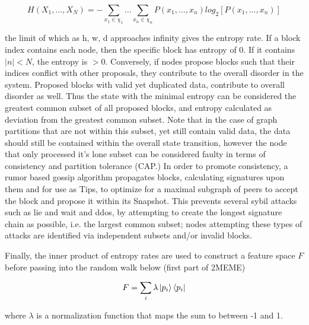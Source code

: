 \documentclass{article}
\begin{document}
\begin{equation}
H(X_1, \dots, X_N) = -\sum_{x_1 \in \chi_1} \dots \sum_{x_n \in \chi_n} P(x_1,  \dots, x_n) log_2 [P(x_1, \dots, x_n)]
\end{equation}
	
	the limit of which as h, w, d approaches infinity gives the entropy rate.
If a block index contains each node, then the specific block has entropy of 0. If it contains $|n| < N$, the entropy is $> 0$. Conversely, if nodes propose blocks such that their indices conflict with other proposals, they contribute to the overall disorder in the system. Proposed blocks with valid yet duplicated data, contribute to overall disorder as well. Thus the state with the minimal entropy can be considered the greatest common subset of all proposed blocks, and entropy calculated as deviation from the greatest common subset. Note that in the case of graph partitions that are not within this subset, yet still contain valid data, the data should still be contained within the overall state transition, however the node that only processed it’s lone subset can be considered faulty in terms of consistency and partition tolerance (CAP.) In order to promote consistency, a rumor based gossip algorithm propagates blocks, calculating signatures upon them and for use as Tips, to optimize for a maximal subgraph of peers to accept the block and propose it within its Snapshot. This prevents several sybil attacks such as lie and wait and ddos, by attempting to create the longest signature chain as possible, i.e. the largest common subset; nodes attempting these types of attacks are identified via independent subsets and/or invalid blocks.

Finally, the inner product of entropy rates are used to construct a feature space $F$ before passing into the random walk below (first part of 2MEME)

\begin{equation}
F = \sum_i \lambda \ket{p_i} \bra{p_i}
\end{equation}

where $\lambda$ is a normalization function that maps the sum to between -1 and 1.
\end{document}
